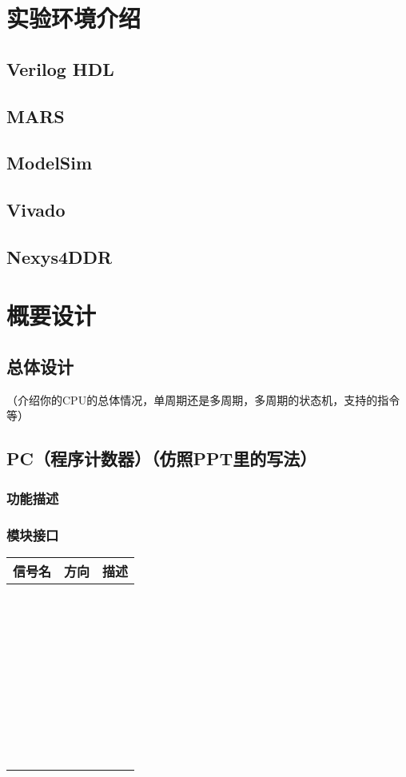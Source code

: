 \documentclass[forprint]{cpu}
\begin{document}
\chapter{实验环境介绍}

\section{Verilog HDL}
\section{MARS}
\section{ModelSim}
\section{Vivado}
\section{Nexys4DDR}


\chapter{概要设计}
\section{总体设计}
\begin{description}
    \item （介绍你的CPU的总体情况，单周期还是多周期，多周期的状态机，支持的指令等）
\end{description}


\section{PC（程序计数器）（仿照PPT里的写法）}
\subsection{功能描述}
\subsection{模块接口}
\begin{table}[!ht]
    \centering
    \begin{tabular}{|l|l|l|}
    \hline
        信号名 &  方向 & 描述 \\ \hline
        ~ & ~ & ~ \\ \hline
        ~ & ~ & ~ \\ \hline
        ~ & ~ & ~ \\ \hline
        ~ & ~ & ~ \\ \hline
        ~ & ~ & ~ \\ \hline
        ~ & ~ & ~ \\ \hline
        ~ & ~ & ~ \\ \hline
        ~ & ~ & ~ \\ \hline

    \end{tabular}
\end{table}
\end{document}
